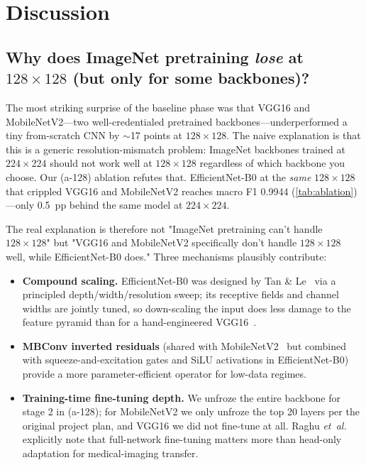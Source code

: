 \documentclass[journal,onecolumn,11pt]{IEEEtran}
\begin{document}
\section{Discussion}
\label{sec:discussion}

\subsection{Why does ImageNet pretraining \emph{lose} at $128{\times}128$
(but only for some backbones)?}

The most striking surprise of the baseline phase was that VGG16 and
MobileNetV2---two well-credentialed pretrained backbones---underperformed
a tiny from-scratch CNN by $\sim$17 points at $128{\times}128$. The
naive explanation is that this is a generic resolution-mismatch problem:
ImageNet backbones trained at $224{\times}224$ should not work well at
$128{\times}128$ regardless of which backbone you choose. Our (a-128)
ablation refutes that. EfficientNet-B0 at the \emph{same}
$128{\times}128$ that crippled VGG16 and MobileNetV2 reaches macro F1
0.9944 (\cref{tab:ablation})---only 0.5~pp behind the same model at
$224{\times}224$.

The real explanation is therefore not "ImageNet pretraining can't
handle $128{\times}128$" but "VGG16 and MobileNetV2 specifically don't
handle $128{\times}128$ well, while EfficientNet-B0 does." Three
mechanisms plausibly contribute:

\begin{itemize}[leftmargin=*,itemsep=1pt,topsep=1pt]
  \item \textbf{Compound scaling.} EfficientNet-B0 was designed by Tan
        \& Le~\cite{tan2019efficientnet} via a principled
        depth/width/resolution sweep; its receptive fields and channel
        widths are jointly tuned, so down-scaling the input does less
        damage to the feature pyramid than for a hand-engineered
        VGG16~\cite{simonyan2014vgg}.
  \item \textbf{MBConv inverted residuals} (shared with
        MobileNetV2~\cite{sandler2018mobilenetv2} but combined with
        squeeze-and-excitation gates and SiLU activations in
        EfficientNet-B0) provide a more parameter-efficient operator
        for low-data regimes.
  \item \textbf{Training-time fine-tuning depth.} We unfroze the entire
        backbone for stage 2 in (a-128); for MobileNetV2 we only
        unfroze the top 20 layers per the original project plan, and
        VGG16 we did not fine-tune at all. Raghu
        \textit{et~al.}~\cite{raghu2019transfusion} explicitly note that
        full-network fine-tuning matters more than head-only adaptation
        for medical-imaging transfer.
\end{itemize}
\end{document}

